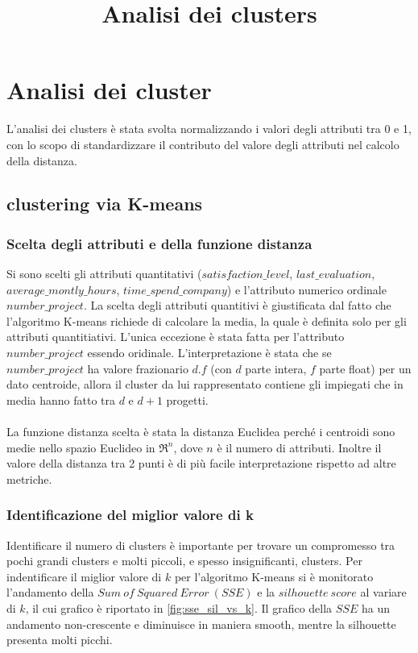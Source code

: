 \documentclass[10pt,a4paper,twocolumn]{article}
\title{Analisi dei clusters}
\begin{document}
\section{Analisi dei cluster}
L'analisi dei clusters è stata svolta normalizzando i valori degli attributi tra 0 e 1, con lo scopo di standardizzare il contributo del valore degli attributi nel calcolo della distanza.

\subsection{clustering via K-means}
\subsubsection{Scelta degli attributi e della funzione distanza}
Si sono scelti gli attributi quantitativi ($satisfaction\_level$, $last\_evaluation$, $average\_montly\_hours$, $time\_spend\_company$) e l'attributo numerico ordinale $number\_project$. 
La scelta degli attributi quantitivi è giustificata dal fatto che l'algoritmo K-means richiede di calcolare la media, la quale è definita solo per gli attributi quantitiativi. 
L'unica eccezione è stata fatta per l'attributo $number\_project$ essendo oridinale.
L'interpretazione è stata che se $number\_project$ ha valore frazionario $d.f$ (con $d$ parte intera, $f$ parte float) per un dato centroide, allora il cluster da lui rappresentato contiene gli impiegati che in media hanno fatto tra $d$ e $d+1$ progetti.
\paragraph{}
La funzione distanza scelta è stata la distanza Euclidea perché i centroidi sono medie nello spazio Euclideo in $\Re^{n}$, dove $n$ è il numero di attributi. Inoltre il valore  della distanza tra 2 punti è di più facile interpretazione rispetto ad altre metriche. 

\subsubsection{Identificazione del miglior valore di k} \label{trovare_valore_di_k}
Identificare il numero di clusters è importante per trovare un compromesso tra pochi grandi clusters e molti piccoli, e spesso insignificanti, clusters. Per indentificare il miglior valore di $k$ per l'algoritmo K-means si è monitorato l'andamento della $Sum\ of\ Squared\ Error\ (SSE)$ e la $silhouette\ score$ al variare di $k$, il cui grafico è riportato in \autoref{fig:sse_sil_vs_k}. Il grafico della $SSE$ ha un andamento non-crescente e diminuisce in maniera smooth, mentre la silhouette presenta molti picchi.
\end{document}
